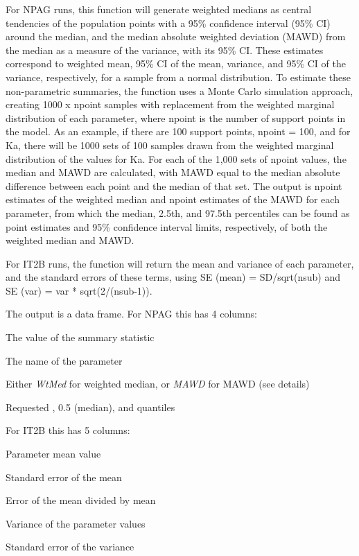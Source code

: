 \documentclass[a4paper]{book}
\begin{document}
\begin{Details}\relax
For NPAG runs, this function will generate weighted medians as central tendencies of the
population points with a 95\% confidence interval (95\% CI) around the median, 
and the median absolute weighted deviation (MAWD) from the median as a measure 
of the variance, with its 95\% CI.  These estimates correspond to weighted mean, 
95\% CI of the mean, variance, and 95\% CI of the variance, respectively, for a 
sample from a normal distribution.  To estimate these non-parametric summaries, 
the function uses a Monte Carlo simulation approach, creating  1000 x npoint samples 
with replacement from the weighted marginal distribution of each parameter, 
where npoint is the number of support points in the model.  As an example, 
if there are 100 support points, npoint = 100, and for Ka, there will be 
1000 sets of 100 samples drawn from the weighted marginal distribution of the 
values for Ka.  For each of the 1,000 sets of npoint values, the median and MAWD are 
calculated, with MAWD equal to the median absolute difference between each point 
and the median of that set.  The output is npoint estimates of the weighted median 
and npoint estimates of the MAWD for each parameter, from which the median, 2.5th, 
and 97.5th percentiles can be found as point estimates and 95\% confidence 
interval limits, respectively, of both the weighted median and MAWD.

For IT2B runs, the function will return the mean and variance of each parameter,
and the standard errors of these terms, using SE (mean) = SD/sqrt(nsub) and 
SE (var) = var * sqrt(2/(nsub-1)).
\end{Details}
%
\begin{Value}
The output is a data frame.
For NPAG this has 4 columns:
\begin{ldescription}
\item[\code{value }] The value of the summary statistic
\item[\code{par }] The name of the parameter
\item[\code{type }] Either \emph{WtMed} for weighted median, or \emph{MAWD} for MAWD (see details)
\item[\code{quantile }] Requested , 0.5 (median), and  quantiles
\end{ldescription}
For IT2B this has 5 columns:
\begin{ldescription}
\item[\code{mean }] Parameter mean value
\item[\code{se.mean }] Standard error of the mean
\item[\code{cv.mean }] Error of the mean divided by mean
\item[\code{var }] Variance of the parameter values
\item[\code{se.var }] Standard error of the variance
\end{ldescription}
\end{Value}
\end{document}
